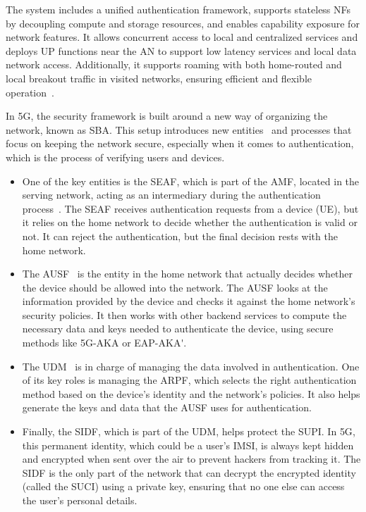 The system includes a unified authentication framework, supports stateless \acp{NF} by decoupling compute and storage resources, and enables capability exposure for network features. It allows concurrent access to local and centralized services and deploys \ac{UP} functions near the \acl{AN} to support low latency services and local data network access. Additionally, it supports roaming with both home-routed and local breakout traffic in visited networks, ensuring efficient and flexible operation~\cite{23.501-p41}.

In \ac{5G}, the security framework is built around a new way of organizing the network, known as \ac{SBA}. This setup introduces new entities~\cite{33.501-p30} and processes that focus on keeping the network secure, especially when it comes to authentication, which is the process of verifying users and devices.

\begin{itemize}
    \item{
        One of the key entities is the \ac{SEAF}, which is part of the \ac{AMF}, located in the serving network, acting as an intermediary during the authentication process~\cite{23.501-p48}. The \ac{SEAF} receives authentication requests from a device (\ac{UE}), but it relies on the home network to decide whether the authentication is valid or not. It can reject the authentication, but the final decision rests with the home network.
    }
    \item{
        The \ac{AUSF}~\cite{23.501-p538} is the entity in the home network that actually decides whether the device should be allowed into the network. The \ac{AUSF} looks at the information provided by the device and checks it against the home network's security policies. It then works with other backend services to compute the necessary data and keys needed to authenticate the device, using secure methods like \acf{5G-AKA} or \acf{EAP-AKA'}.
    }
    \item{
        The \ac{UDM}~\cite{23.501-p538} is in charge of managing the data involved in authentication. One of its key roles is managing the \ac{ARPF}, which selects the right authentication method based on the device's identity and the network's policies. It also helps generate the keys and data that the \ac{AUSF} uses for authentication.
    }
    \item{
        Finally, the \ac{SIDF}, which is part of the \ac{UDM}, helps protect the \ac{SUPI}. In \ac{5G}, this permanent identity, which could be a user’s \ac{IMSI}, is always kept hidden and encrypted when sent over the air to prevent hackers from tracking it. The \ac{SIDF} is the only part of the network that can decrypt the encrypted identity~\cite{33.501-p37} (called the \ac{SUCI}) using a private key, ensuring that no one else can access the user’s personal details.
    }
\end{itemize}

